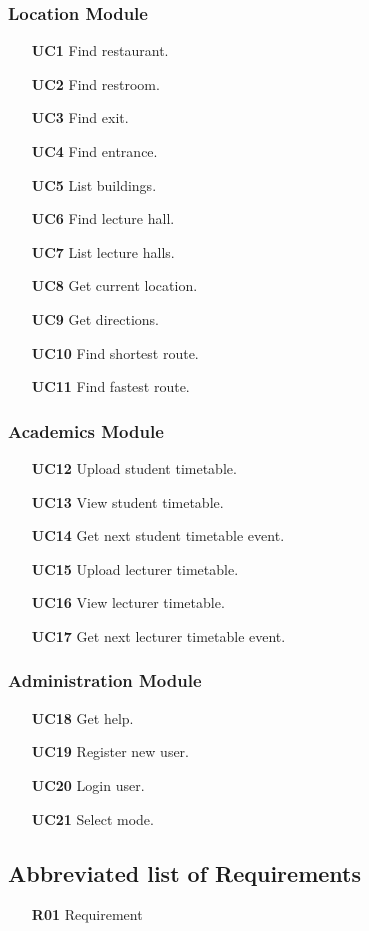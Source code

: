 \documentclass[12pt,a4paper]{article}
\begin{document}
			\subsubsection{Location Module}

				\begin{itemize}
					\item [\textbf{UC1}] Find restaurant.
					\item [\textbf{UC2}] Find restroom.
					\item [\textbf{UC3}] Find exit.
					\item [\textbf{UC4}] Find entrance.
					\item [\textbf{UC5}] List buildings.
					\item [\textbf{UC6}] Find lecture hall.
					\item [\textbf{UC7}] List lecture halls.
					\item [\textbf{UC8}] Get current location.
					\item [\textbf{UC9}] Get directions.
					\item [\textbf{UC10}] Find shortest route.
					\item [\textbf{UC11}] Find fastest route.
				\end{itemize}

			\subsubsection{Academics Module}

				\begin{itemize}
					\item [\textbf{UC12}] Upload student timetable.
					\item [\textbf{UC13}] View student timetable.
					\item [\textbf{UC14}] Get next student timetable event.
					\item [\textbf{UC15}] Upload lecturer timetable.
					\item [\textbf{UC16}] View lecturer timetable.
					\item [\textbf{UC17}] Get next lecturer timetable event.
				\end{itemize}

			\subsubsection{Administration Module}

				\begin{itemize}
					\item [\textbf{UC18}] Get help.
					\item [\textbf{UC19}] Register new user.
					\item [\textbf{UC20}] Login user.
					\item [\textbf{UC21}] Select mode.

				\end{itemize}

		\subsection{Abbreviated list of Requirements}

			\begin{itemize}
				\item [\textbf{R01}] Requirement
			\end{itemize}
\end{document}
